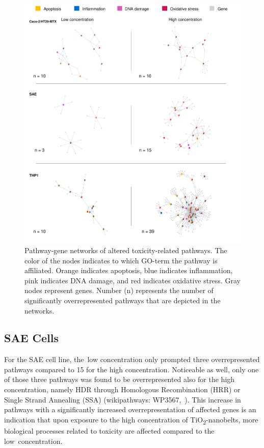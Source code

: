 \documentclass[ijms,article,accept,moreauthors,pdftex]{Definitions/mdpi}
\begin{document}
\begin{paracol}{2}
\begin{figure}[H]
\includegraphics[width=1\linewidth]{fig2.pdf}
  \caption{Pathway-gene networks of altered toxicity-related pathways.
   The color of the nodes indicates to which GO-term the pathway is affiliated. Orange indicates apoptosis, blue indicates inflammation, pink indicates DNA damage, and 
   red %
   indicates oxidative stress. Gray nodes represent genes. Number (n) represents the number of significantly overrepresented pathways that are depicted in the networks.}
\label{fig:fig2}
\end{figure}
\unskip
\subsection{SAE Cells}
For the SAE cell line, the~low concentration only prompted three overrepresented pathways compared to 15 for the high concentration. Noticeable as well, only one of those three pathways was found to be overrepresented also for the high concentration, namely HDR through Homologous Recombination (HRR) or Single Strand Annealing (SSA) (wikipathways: WP3567,~\cite{WP3567}). This increase in pathways with a significantly increased overrepresentation of affected genes is an indication that upon exposure to the high concentration of TiO\textsubscript{2}-nanobelts, more biological processes related to toxicity are affected compared to the low~concentration. 


\end{paracol}
\end{document}
